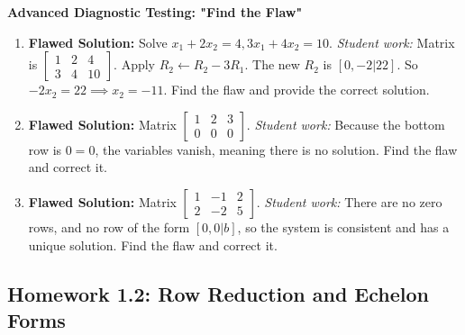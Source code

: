 \documentclass[11pt]{article}
\begin{document}
\textbf{Advanced Diagnostic Testing: "Find the Flaw"}
\begin{enumerate}[label=\textbf{1.1.\arabic*}, resume]
    \item \textbf{Flawed Solution:} Solve $x_1+2x_2=4, 3x_1+4x_2=10$. \textit{Student work:} Matrix is $\left[\begin{array}{cc|c} 1 & 2 & 4 \\ 3 & 4 & 10 \end{array}\right]$. Apply $R_2 \leftarrow R_2 - 3R_1$. The new $R_2$ is $[0, -2 | 22]$. So $-2x_2 = 22 \implies x_2 = -11$. Find the flaw and provide the correct solution.
    \item \textbf{Flawed Solution:} Matrix $\left[\begin{array}{cc|c} 1 & 2 & 3 \\ 0 & 0 & 0 \end{array}\right]$. \textit{Student work:} Because the bottom row is $0=0$, the variables vanish, meaning there is no solution. Find the flaw and correct it.
    \item \textbf{Flawed Solution:} Matrix $\left[\begin{array}{cc|c} 1 & -1 & 2 \\ 2 & -2 & 5 \end{array}\right]$. \textit{Student work:} There are no zero rows, and no row of the form $[0, 0 | b]$, so the system is consistent and has a unique solution. Find the flaw and correct it.
\end{enumerate}

\subsection{Homework 1.2: Row Reduction and Echelon Forms}
\end{document}
